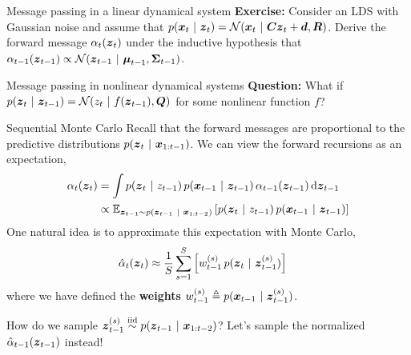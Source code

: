 \documentclass[aspectratio=169]{beamer}
\begin{document}
\begin{frame}[t]{Message passing in a linear dynamical system}
\textbf{Exercise:} Consider an LDS with Gaussian noise and assume that $p(\boldsymbol{x}_t ~\vert~ \boldsymbol{z}_t) = \mathcal{N}(\boldsymbol{x}_t ~\vert~ \boldsymbol{C} \boldsymbol{z}_t + \boldsymbol{d}, \boldsymbol{R})$. Derive the forward message $\alpha_t(\boldsymbol{z}_t)$ under the inductive hypothesis that $\alpha_{t-1}(\boldsymbol{z}_{t-1}) \propto \mathcal{N}(\boldsymbol{z}_{t-1} ~\vert~ \boldsymbol{\mu}_{t-1}, \boldsymbol{\Sigma}_{t-1})$.
\end{frame}

\begin{frame}[t]{Message passing in nonlinear dynamical systems}
\textbf{Question:} What if $p(\boldsymbol{z}_t ~\vert~ \boldsymbol{z}_{t-1}) = \mathcal{N}(z_t ~\vert~ f(\boldsymbol{z}_{t-1}), \boldsymbol{Q})$ for some nonlinear function $f$? 

\end{frame}

\begin{frame}{Sequential Monte Carlo}
Recall that the forward messages are proportional to the predictive distributions $p(\boldsymbol{z}_t ~\vert~ \boldsymbol{x}_{1:t-1})$. We can view the forward recursions as an expectation,
\begin{align}
    \alpha_t(\boldsymbol{z}_t) &= \int p(\boldsymbol{z}_t ~\vert~ z_{t-1}) \, p(\boldsymbol{x}_{t-1} ~\vert~ \boldsymbol{z}_{t-1}) \, \alpha_{t-1}(\boldsymbol{z}_{t-1}) \mathop{}\!\mathrm{d} {\boldsymbol{z}_{t-1}} \\
    &\propto \mathbb{E}_{\boldsymbol{z}_{t-1} \sim p(\boldsymbol{z}_{t-1} ~\vert~ \boldsymbol{x}_{1:t-2})} \left[ p(\boldsymbol{z}_t ~\vert~ z_{t-1}) \, p(\boldsymbol{x}_{t-1} ~\vert~ \boldsymbol{z}_{t-1}) \right] 
\end{align}
One natural idea is to approximate this expectation with Monte Carlo,
\begin{align}
    \hat{\alpha}_t(\boldsymbol{z}_t) 
    &\approx \frac{1}{S} \sum_{s=1}^S \left[ w_{t-1}^{(s)} \, p(\boldsymbol{z}_t ~\vert~ \boldsymbol{z}_{t-1}^{(s)})  \right] 
\end{align}
where we have defined the \textbf{weights} $w_{t-1}^{(s)} \triangleq p(\boldsymbol{x}_{t-1} ~\vert~ \boldsymbol{z}_{t-1}^{(s)})$.

How do we sample $\boldsymbol{z}_{t-1}^{(s)} \stackrel{\text{iid}}{\sim} p(\boldsymbol{z}_{t-1} ~\vert~ \boldsymbol{x}_{1:t-2})$? Let's sample the normalized $\hat{\alpha}_{t-1}(\boldsymbol{z}_{t-1})$ instead!
\end{frame}
\end{document}
